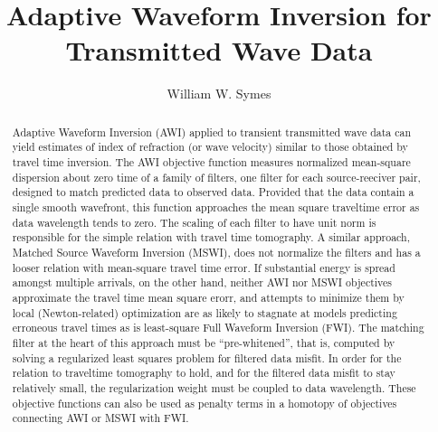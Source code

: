 \title{Adaptive Waveform Inversion for Transmitted Wave Data}
\author{William W. Symes}

\begin{abstract} Adaptive Waveform Inversion (AWI) applied to
  transient transmitted wave data can yield estimates of index of
  refraction (or wave velocity) similar to those obtained by travel
  time inversion. The AWI objective function measures normalized
  mean-square dispersion about zero time of a family of filters, one
  filter for each source-reeciver pair, designed to match predicted
  data to observed data. Provided that the data contain a single
  smooth wavefront, this function approaches the mean square
  traveltime error as data wavelength tends to zero. The scaling of
  each filter to have unit norm is responsible for the simple relation
  with travel time tomography. A similar approach, Matched Source
  Waveform Inversion (MSWI), does not normalize the filters and has a
  looser relation with mean-square travel time error. If substantial
  energy is spread amongst multiple arrivals, on the other hand,
  neither AWI nor MSWI objectives approximate the travel time mean
  square erorr, and attempts to minimize them by local
  (Newton-related) optimization are as likely to stagnate at models
  predicting erroneous travel times as is least-square Full Waveform
  Inversion (FWI). The matching filter at the heart of this approach
  must be ``pre-whitened'', that is, computed by solving a regularized
  least squares problem for filtered data misfit. In order for the
  relation to traveltime tomography to hold, and for the filtered data
  misfit to stay relatively small, the regularization weight must be
  coupled to data wavelength. These objective functions can also be
  used as penalty terms in a homotopy of objectives connecting AWI or
  MSWI with FWI. \end{abstract}


